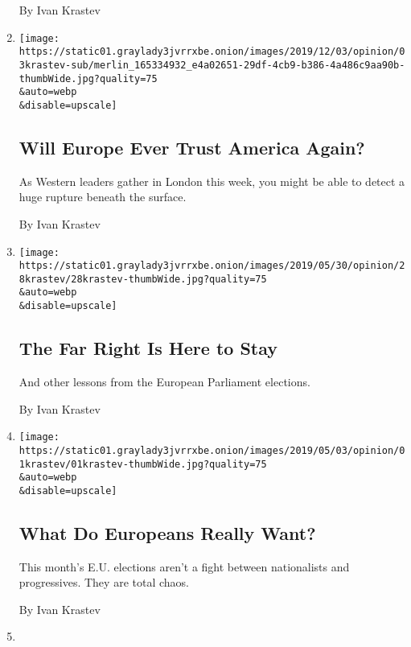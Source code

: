 \begin{enumerate}
  By Ivan Krastev
\item
  \href{/2019/12/03/opinion/trump-nato-europe.html}{}

  \texttt{[image: https://static01.graylady3jvrrxbe.onion/images/2019/12/03/opinion/03krastev-sub/merlin\_165334932\_e4a02651-29df-4cb9-b386-4a486c9aa90b-thumbWide.jpg?quality=75\\\&auto=webp\\\&disable=upscale]}

  \hypertarget{will-europe-ever-trust-america-again}{%
  \subsection{Will Europe Ever Trust America
  Again?}\label{will-europe-ever-trust-america-again}}

  As Western leaders gather in London this week, you might be able to
  detect a huge rupture beneath the surface.

  By Ivan Krastev
\item
  \href{/2019/05/28/opinion/european-elections.html}{}

  \texttt{[image: https://static01.graylady3jvrrxbe.onion/images/2019/05/30/opinion/28krastev/28krastev-thumbWide.jpg?quality=75\\\&auto=webp\\\&disable=upscale]}

  \hypertarget{the-far-right-is-here-to-stay}{%
  \subsection{The Far Right Is Here to
  Stay}\label{the-far-right-is-here-to-stay}}

  And other lessons from the European Parliament elections.

  By Ivan Krastev
\item
  \href{/2019/05/01/opinion/european-elections.html}{}

  \texttt{[image: https://static01.graylady3jvrrxbe.onion/images/2019/05/03/opinion/01krastev/01krastev-thumbWide.jpg?quality=75\\\&auto=webp\\\&disable=upscale]}

  \hypertarget{what-do-europeans-really-want}{%
  \subsection{What Do Europeans Really
  Want?}\label{what-do-europeans-really-want}}

  This month's E.U. elections aren't a fight between nationalists and
  progressives. They are total chaos.

  By Ivan Krastev
\item
  \href{/2019/03/18/opinion/orban-poland-israel-netanyahu.html}{}


\end{enumerate}
